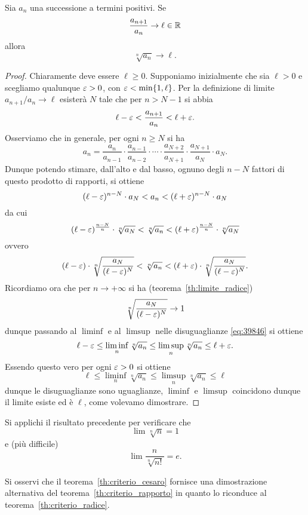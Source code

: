 \begin{theorem}
\label{th:criterio_cesaro}
\mymark{*}
Sia $a_n$ una successione a termini positivi.
Se
\[
  \frac{a_{n+1}}{a_n} \to \ell \in \mathbb R
\]
allora
\[
 \sqrt[n]{a_n}\to \ell.
\]
\end{theorem}
%
\begin{proof}
Chiaramente deve essere $\ell\ge 0$. Supponiamo inizialmente
che sia $\ell>0$ e scegliamo qualunque $\varepsilon>0$, con $\varepsilon < \min\{1,\ell\}$.
Per la definizione di limite $a_{n+1}/a_n \to \ell$ esisterà $N$ tale che per $n>N-1$ si abbia
\[
  \ell -\varepsilon < \frac{a_{n+1}}{a_n} < \ell + \varepsilon.
\]
Osserviamo che in generale, per ogni $n\ge N$ si ha
\[
 a_n  = \frac{a_n}{a_{n-1}}\cdot\frac{a_{n-1}}{a_{n-2}}
 \cdot\cdots\cdot
     \frac{a_{N+2}}{a_{N+1}}\cdot\frac{a_{N+1}}{a_N}
     \cdot a_N.
\]
Dunque potendo stimare,
dall'alto e dal basso,
ognuno degli $n-N$ fattori di questo
prodotto di rapporti, si ottiene
\[
(\ell -\varepsilon)^{n-N} \cdot a_N < a_n < (\ell +\varepsilon)^{n-N} \cdot a_N
\]
da cui
\[
(\ell -\varepsilon)^{\frac{n-N}{n}} \cdot \sqrt[n]{a_N}
< \sqrt[n]{a_n}
< (\ell +\varepsilon)^{\frac{n-N}{n}} \cdot \sqrt[n]{a_N}
\]
ovvero
\begin{equation}\label{eq:39846}
(\ell -\varepsilon) \cdot \sqrt[n]{\frac{a_N}{(\ell -\varepsilon)^N}}
< \sqrt[n]{a_n}
< (\ell +\varepsilon) \cdot \sqrt[n]{\frac{a_N}{(\ell -\varepsilon)^N}}.
\end{equation}
Ricordiamo ora che per $n\to +\infty$ si ha (teorema~\ref{th:limite_radice})
\[
\sqrt[n]{\frac{a_N}{(\ell -\varepsilon)^N}} \to 1
\]
dunque passando al $\liminf$ e al $\limsup$ nelle disuguaglianze \eqref{eq:39846}
si ottiene
\[
 \ell-\varepsilon \le \liminf_n \sqrt[n]{a_n}\le \limsup_n \sqrt[n]{a_n}\le \ell+\varepsilon.
\]
Essendo questo vero per ogni $\varepsilon>0$ si ottiene
\[
\ell \le \liminf_n \sqrt[n]{a_n}\le \limsup_n \sqrt[n]{a_n}\le \ell
\]
dunque le disuguaglianze sono uguaglianze, $\liminf$ e $\limsup$ coincidono
dunque il limite esiste ed è $\ell$, come volevamo dimostrare.
\end{proof}

\begin{exercise}
Si applichi il risultato precedente per
verificare che
\[
   \lim \sqrt[n]{n} = 1
\]
e (più difficile)
\[
  \lim \frac{n}{\sqrt[n]{n!}} = e.
\]
\end{exercise}

Si osservi che il teorema~\ref{th:criterio_cesaro} fornisce una dimostrazione
alternativa del teorema~\ref{th:criterio_rapporto} in quanto lo riconduce
al teorema~\ref{th:criterio_radice}.


